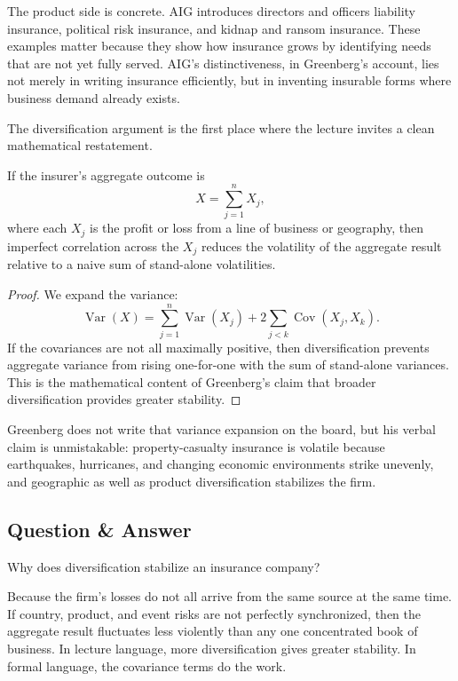 The product side is concrete. AIG introduces directors and officers liability insurance, political risk insurance, and kidnap and ransom insurance. These examples matter because they show how insurance grows by identifying needs that are not yet fully served. AIG's distinctiveness, in Greenberg's account, lies not merely in writing insurance efficiently, but in inventing insurable forms where business demand already exists.

The diversification argument is the first place where the lecture invites a clean mathematical restatement.

\begin{proposition}
If the insurer's aggregate outcome is
\begin{equation}
X = \sum_{j=1}^{n} X_j,
\end{equation}
where each \(X_j\) is the profit or loss from a line of business or geography, then imperfect correlation across the \(X_j\) reduces the volatility of the aggregate result relative to a naive sum of stand-alone volatilities.
\end{proposition}

\begin{proof}
We expand the variance:
\begin{equation}
\operatorname{Var}(X)
=
\sum_{j=1}^{n}\operatorname{Var}(X_j)
+
2\sum_{j<k}\operatorname{Cov}(X_j,X_k).
\end{equation}
If the covariances are not all maximally positive, then diversification prevents aggregate variance from rising one-for-one with the sum of stand-alone variances. This is the mathematical content of Greenberg's claim that broader diversification provides greater stability.
\end{proof}

Greenberg does not write that variance expansion on the board, but his verbal claim is unmistakable: property-casualty insurance is volatile because earthquakes, hurricanes, and changing economic environments strike unevenly, and geographic as well as product diversification stabilizes the firm.

\subsection{Question \& Answer}

Why does diversification stabilize an insurance company?

Because the firm's losses do not all arrive from the same source at the same time. If country, product, and event risks are not perfectly synchronized, then the aggregate result fluctuates less violently than any one concentrated book of business. In lecture language, more diversification gives greater stability. In formal language, the covariance terms do the work.

